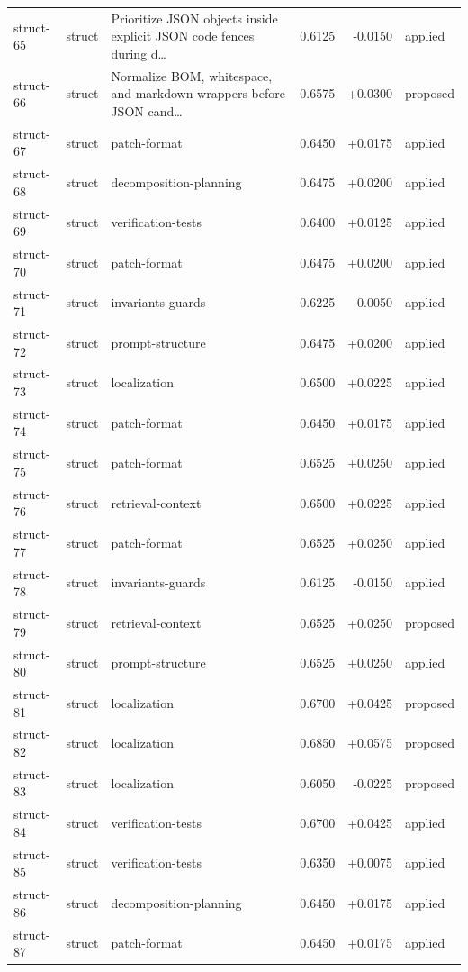 \begin{center}
\begin{longtable}{llp{5.2cm}rrl}
struct-65 & struct & Prioritize JSON objects inside explicit JSON code fences during d\ldots{} & 0.6125 & -0.0150 & applied \\
struct-66 & struct & Normalize BOM, whitespace, and markdown wrappers before JSON cand\ldots{} & 0.6575 & +0.0300 & proposed \\
struct-67 & struct & patch-format & 0.6450 & +0.0175 & applied \\
struct-68 & struct & decomposition-planning & 0.6475 & +0.0200 & applied \\
struct-69 & struct & verification-tests & 0.6400 & +0.0125 & applied \\
struct-70 & struct & patch-format & 0.6475 & +0.0200 & applied \\
struct-71 & struct & invariants-guards & 0.6225 & -0.0050 & applied \\
struct-72 & struct & prompt-structure & 0.6475 & +0.0200 & applied \\
struct-73 & struct & localization & 0.6500 & +0.0225 & applied \\
struct-74 & struct & patch-format & 0.6450 & +0.0175 & applied \\
struct-75 & struct & patch-format & 0.6525 & +0.0250 & applied \\
struct-76 & struct & retrieval-context & 0.6500 & +0.0225 & applied \\
struct-77 & struct & patch-format & 0.6525 & +0.0250 & applied \\
struct-78 & struct & invariants-guards & 0.6125 & -0.0150 & applied \\
struct-79 & struct & retrieval-context & 0.6525 & +0.0250 & proposed \\
struct-80 & struct & prompt-structure & 0.6525 & +0.0250 & applied \\
struct-81 & struct & localization & 0.6700 & +0.0425 & proposed \\
struct-82 & struct & localization & 0.6850 & +0.0575 & proposed \\
struct-83 & struct & localization & 0.6050 & -0.0225 & proposed \\
struct-84 & struct & verification-tests & 0.6700 & +0.0425 & applied \\
struct-85 & struct & verification-tests & 0.6350 & +0.0075 & applied \\
struct-86 & struct & decomposition-planning & 0.6450 & +0.0175 & applied \\
struct-87 & struct & patch-format & 0.6450 & +0.0175 & applied \\

\end{longtable}
\end{center}
